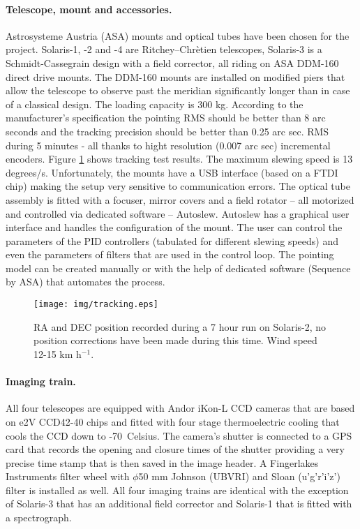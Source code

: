 \paragraph{Telescope, mount and accessories.}
Astrosysteme Austria (ASA) mounts and optical tubes have been chosen for the project. Solaris-1, -2 and -4 are Ritchey--Chr\`etien telescopes, Solaris-3 is a Schmidt-Cassegrain design with a field corrector, all riding on ASA DDM-160 direct drive mounts. The DDM-160 mounts are installed on modified piers that allow the telescope to observe past the meridian significantly longer than in case of a classical design. The loading capacity is 300 kg. According to the manufacturer's specification the pointing RMS should be better than 8 arc seconds and the tracking precision should be better than 0.25 arc sec. RMS during 5 minutes - all thanks to hight resolution (0.007 arc sec) incremental encoders. Figure \ref{fig:TrackingTest} shows tracking test results. The maximum slewing speed is 13 degrees/s. Unfortunately, the mounts have a USB interface (based on a FTDI chip) making the setup very sensitive to communication errors. The optical tube assembly is fitted with a focuser, mirror covers and a field rotator -- all motorized and controlled via dedicated software -- Autoslew. Autoslew has a graphical user interface and handles the configuration of the mount. The user can control the parameters of the PID controllers (tabulated for different slewing speeds) and even the parameters of filters that are used in the control loop. The pointing model can be created manually or with the help of dedicated software (Sequence by ASA) that automates the process.

\begin{figure}[htb!]
\centering
\texttt{[image: img/tracking.eps]}
\caption{RA and DEC position recorded during a 7 hour run on Solaris-2, no position corrections have been made during this time. Wind speed 12-15 km h$^{-1}$.}
\label{fig:TrackingTest}
\end{figure}

\paragraph{Imaging train.}
All four telescopes are equipped with Andor iKon-L CCD cameras that are based on e2V CCD42-40 chips and fitted with four stage thermoelectric cooling that cools the CCD down to -70\degree~Celsius. The camera's shutter is connected to a GPS card that records the opening and closure times of the shutter providing a very precise time stamp that is then saved in the image header. A Fingerlakes Instruments filter wheel with $\phi$50 mm Johnson (UBVRI) and Sloan (u'g'r'i'z') filter is installed as well. All four imaging trains are identical with the exception of Solaris-3 that has an additional field corrector and Solaris-1 that is fitted with a spectrograph.

